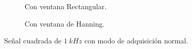 \begin{figure}[H]
\begin{subfigure}[H]{0.39\textwidth}
        \caption{Con ventana Rectangular.}
      \end{subfigure}
      \hfill 
      \begin{subfigure}[H]{0.40\textwidth}
        \caption{Con ventana de Hanning.}
      \end{subfigure}

      \caption{Señal cuadrada de $1~kHz$ con modo de adquisición normal.}
      \label{fig:SeñalCuadModoNormal}
    \end{figure}

